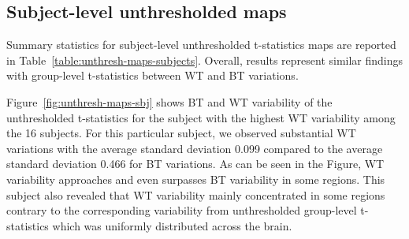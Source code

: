 \documentclass[conference]{IEEEtran}
\begin{document}
  \begin{figure}[ht]
  \end{figure}

  \subsection{Subject-level unthresholded maps}

  Summary statistics for subject-level unthresholded t-statistics maps are
  reported in Table~\ref{table:unthresh-maps-subjects}. Overall, results
  represent similar findings with group-level t-statistics between WT and
  BT variations.

  Figure~\ref{fig:unthresh-maps-sbj} shows BT and WT variability of the
  unthresholded t-statistics for the subject with the highest WT
  variability among the 16 subjects.
  For this particular subject, we observed substantial WT variations with the average standard deviation 0.099 compared to 
  the average standard deviation 0.466 for BT variations.
  As can be seen in the Figure, WT variability approaches and even surpasses BT variability in some regions.
  This subject also revealed that WT variability mainly concentrated in some regions  
  contrary to the corresponding variability from unthresholded group-level t-statistics which was uniformly distributed across the brain.
\end{document}
